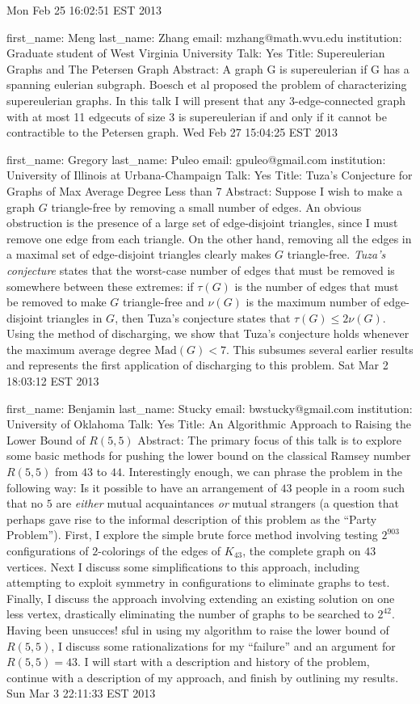 \documentclass{article}
\begin{document}
Mon Feb 25 16:02:51 EST 2013

first_name: Meng
last_name: Zhang
email: mzhang@math.wvu.edu
institution: Graduate student of West Virginia University
Talk: Yes
Title: Supereulerian Graphs and The Petersen Graph
Abstract: A graph G is supereulerian if G has a spanning eulerian subgraph. Boesch et al proposed the problem of characterizing supereulerian graphs. In this talk I will present that any 3-edge-connected graph with at most 11 edgecuts of size 3 is supereulerian if and only if it cannot be contractible to the Petersen graph.
Wed Feb 27 15:04:25 EST 2013


first_name: Gregory
last_name: Puleo
email: gpuleo@gmail.com
institution: University of Illinois at Urbana-Champaign
Talk: Yes
Title: Tuza's Conjecture for Graphs of Max Average Degree Less than 7
Abstract: Suppose I wish to make a graph $G$ triangle-free by removing a small
number of edges.  An obvious obstruction is the presence of a large
set of edge-disjoint triangles, since I must remove one edge from each
triangle. On the other hand, removing all the edges in a maximal set
of edge-disjoint triangles clearly makes $G$ triangle-free.
\emph{Tuza's conjecture} states that the worst-case number of edges
that must be removed is somewhere between these extremes: if $\tau(G)$
is the number of edges that must be removed to make $G$ triangle-free
and $\nu(G)$ is the maximum number of edge-disjoint triangles in $G$,
then Tuza's conjecture states that $\tau(G) \leq 2\nu(G)$. Using the
method of discharging, we show that Tuza's conjecture holds whenever
the maximum average degree $\mathrm{Mad}(G) < 7$. This subsumes
several earlier results and represents the first application of
discharging to this problem.
Sat Mar  2 18:03:12 EST 2013

first_name: Benjamin
last_name: Stucky
email: bwstucky@gmail.com
institution: University of Oklahoma
Talk: Yes
Title: An Algorithmic Approach to Raising the Lower Bound of $R(5,5)$
Abstract: The primary focus of this talk is to explore some basic methods for pushing the lower bound on the classical Ramsey number $R(5,5)$ from $43$ to $44$.  Interestingly enough, we can phrase the problem in the following way: Is it possible to have an arrangement of $43$ people in a room such that no $5$ are \textit{either} mutual acquaintances \textit{or} mutual strangers (a question that perhaps gave rise to the informal description of this problem as the ``Party Problem'').  First, I explore the simple brute force method involving testing $2^{903}$ configurations of $2$-colorings of the edges of $K_{43}$, the complete graph on $43$ vertices.  Next I discuss some simplifications to this approach, including attempting to exploit symmetry in configurations to eliminate graphs to test.  Finally, I discuss the approach involving extending an existing solution on one less vertex, drastically eliminating the number of graphs to be searched to $2^{42}$. Having been unsucces!
 sful in using my algorithm to raise the lower bound of $R(5,5)$, I discuss some rationalizations for my ``failure'' and an argument for $R(5,5)=43$. I will start with a description and history of the problem, continue with a description of my approach, and finish by outlining my results.
Sun Mar  3 22:11:33 EST 2013
\end{document}
